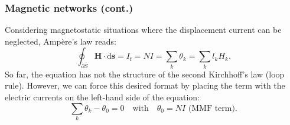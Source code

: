 \begin{frame}
	\frametitle{Magnetic networks (cont.)}
    Considering magnetostatic situations where the displacement current can be neglected, Amp\`ere's law reads:
    \begin{equation}
        \oint_{\partial S} \bm{H} \cdot \mathrm{d}\bm{s} = I_{\mathrm{f}} = N I = \sum_k  \theta_k = \sum_k l_k H_k.
    \end{equation}
    \pause
    So far, the equation has not the structure of the second Kirchhoff’s law (loop rule). However, we can force this desired format by placing the term with the electric currents on the left-hand side of the equation:
    \begin{equation}
         \sum_k \theta_k - \theta_0 = 0 \quad \mbox{with} \quad \theta_0 = N I \,\,\mbox{(MMF term)}.
    \end{equation}
\end{frame}

